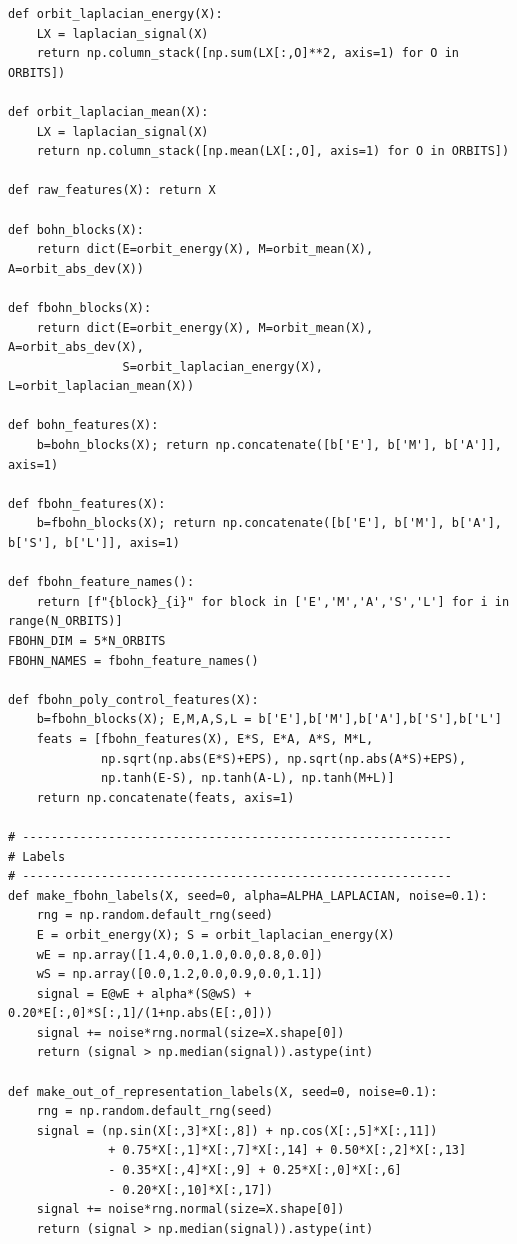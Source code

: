 \documentclass[11pt,a4paper]{report}
\begin{document}
\begin{lstlisting}[caption={Full Python script: RMIG-FBOHN and Meta-FBOHN suite},label={lst:rmig_fbohn_suite}]
def orbit_laplacian_energy(X):
    LX = laplacian_signal(X)
    return np.column_stack([np.sum(LX[:,O]**2, axis=1) for O in ORBITS])

def orbit_laplacian_mean(X):
    LX = laplacian_signal(X)
    return np.column_stack([np.mean(LX[:,O], axis=1) for O in ORBITS])

def raw_features(X): return X

def bohn_blocks(X):
    return dict(E=orbit_energy(X), M=orbit_mean(X), A=orbit_abs_dev(X))

def fbohn_blocks(X):
    return dict(E=orbit_energy(X), M=orbit_mean(X), A=orbit_abs_dev(X),
                S=orbit_laplacian_energy(X), L=orbit_laplacian_mean(X))

def bohn_features(X):
    b=bohn_blocks(X); return np.concatenate([b['E'], b['M'], b['A']], axis=1)

def fbohn_features(X):
    b=fbohn_blocks(X); return np.concatenate([b['E'], b['M'], b['A'], b['S'], b['L']], axis=1)

def fbohn_feature_names():
    return [f"{block}_{i}" for block in ['E','M','A','S','L'] for i in range(N_ORBITS)]
FBOHN_DIM = 5*N_ORBITS
FBOHN_NAMES = fbohn_feature_names()

def fbohn_poly_control_features(X):
    b=fbohn_blocks(X); E,M,A,S,L = b['E'],b['M'],b['A'],b['S'],b['L']
    feats = [fbohn_features(X), E*S, E*A, A*S, M*L,
             np.sqrt(np.abs(E*S)+EPS), np.sqrt(np.abs(A*S)+EPS),
             np.tanh(E-S), np.tanh(A-L), np.tanh(M+L)]
    return np.concatenate(feats, axis=1)

# ------------------------------------------------------------
# Labels
# ------------------------------------------------------------
def make_fbohn_labels(X, seed=0, alpha=ALPHA_LAPLACIAN, noise=0.1):
    rng = np.random.default_rng(seed)
    E = orbit_energy(X); S = orbit_laplacian_energy(X)
    wE = np.array([1.4,0.0,1.0,0.0,0.8,0.0])
    wS = np.array([0.0,1.2,0.0,0.9,0.0,1.1])
    signal = E@wE + alpha*(S@wS) + 0.20*E[:,0]*S[:,1]/(1+np.abs(E[:,0]))
    signal += noise*rng.normal(size=X.shape[0])
    return (signal > np.median(signal)).astype(int)

def make_out_of_representation_labels(X, seed=0, noise=0.1):
    rng = np.random.default_rng(seed)
    signal = (np.sin(X[:,3]*X[:,8]) + np.cos(X[:,5]*X[:,11])
              + 0.75*X[:,1]*X[:,7]*X[:,14] + 0.50*X[:,2]*X[:,13]
              - 0.35*X[:,4]*X[:,9] + 0.25*X[:,0]*X[:,6]
              - 0.20*X[:,10]*X[:,17])
    signal += noise*rng.normal(size=X.shape[0])
    return (signal > np.median(signal)).astype(int)


\end{lstlisting}
\end{document}
